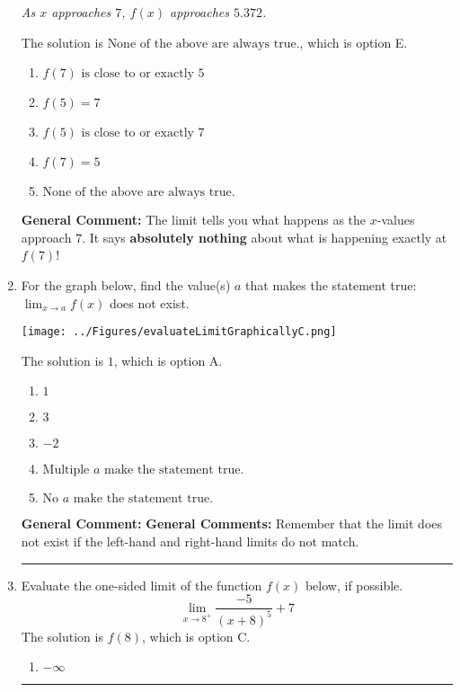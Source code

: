 \documentclass{extbook}[14pt]
\newcommand{\litem}[1]{\item #1

\rule{\textwidth}{0.4pt}}
\begin{document}
\begin{enumerate}
{\begin{center}
    \textit{ As $x$ approaches $7$, $f(x)$ approaches $5.372$. }
\end{center}
The solution is \( \text{None of the above are always true.} \), which is option E.\begin{enumerate}[label=\Alph*.]
\item \( f(7) \text{ is close to or exactly } 5 \)


\item \( f(5) = 7 \)


\item \( f(5) \text{ is close to or exactly } 7 \)


\item \( f(7) = 5 \)


\item \( \text{None of the above are always true.} \)


\end{enumerate}

\textbf{General Comment:} The limit tells you what happens as the $x$-values approach $7$. It says \textbf{absolutely nothing} about what is happening exactly at $f(7)$!
}
\litem{
For the graph below, find the value(s) $a$ that makes the statement true: $ \displaystyle \lim_{x \rightarrow a} f(x)$ does not exist.

\begin{center}
    \texttt{[image: ../Figures/evaluateLimitGraphicallyC.png]}
\end{center}


The solution is \( 1 \), which is option A.\begin{enumerate}[label=\Alph*.]
\item \( 1 \)


\item \( 3 \)


\item \( -2 \)


\item \( \text{Multiple } a \text{ make the statement true}. \)


\item \( \text{No } a \text{ make the statement true}. \)


\end{enumerate}

\textbf{General Comment:} \textbf{General Comments:} Remember that the limit does not exist if the left-hand and right-hand limits do not match.
}
\litem{
Evaluate the one-sided limit of the function $f(x)$ below, if possible.
\[ \lim_{x \rightarrow 8^+} \frac{-5}{(x+8)^5}+7 \]The solution is \( f(8) \), which is option C.\begin{enumerate}[label=\Alph*.]
\item \( -\infty \)



\end{enumerate}}
\end{enumerate}
\end{document}
